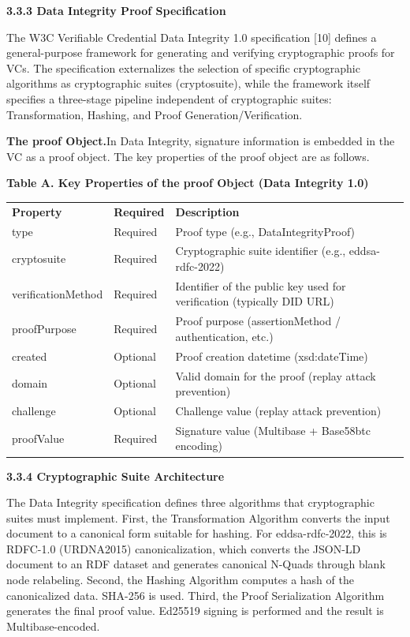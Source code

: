 \textbf{3.3.3 Data Integrity Proof Specification}

The W3C Verifiable Credential Data Integrity 1.0 specification {[}10{]} defines a general-purpose framework for generating and verifying cryptographic proofs for VCs. The specification externalizes the selection of specific cryptographic algorithms as cryptographic suites (cryptosuite), while the framework itself specifies a three-stage pipeline independent of cryptographic suites: Transformation, Hashing, and Proof Generation/Verification.

\textbf{The proof Object.}In Data Integrity, signature information is embedded in the VC as a proof object. The key properties of the proof object are as follows.

\textbf{Table A. Key Properties of the proof Object (Data Integrity 1.0)}

\begin{longtable}[]{@{}lll@{}}
\toprule
\endhead
\textbf{Property} & \textbf{Required} & \textbf{Description}\tabularnewline
type & Required & Proof type (e.g., DataIntegrityProof)\tabularnewline
cryptosuite & Required & Cryptographic suite identifier (e.g., eddsa-rdfc-2022)\tabularnewline
verificationMethod & Required & Identifier of the public key used for verification (typically DID URL)\tabularnewline
proofPurpose & Required & Proof purpose (assertionMethod / authentication, etc.)\tabularnewline
created & Optional & Proof creation datetime (xsd:dateTime)\tabularnewline
domain & Optional & Valid domain for the proof (replay attack prevention)\tabularnewline
challenge & Optional & Challenge value (replay attack prevention)\tabularnewline
proofValue & Required & Signature value (Multibase + Base58btc encoding)\tabularnewline
\bottomrule
\end{longtable}

\textbf{3.3.4 Cryptographic Suite Architecture}

The Data Integrity specification defines three algorithms that cryptographic suites must implement. First, the Transformation Algorithm converts the input document to a canonical form suitable for hashing. For eddsa-rdfc-2022, this is RDFC-1.0 (URDNA2015) canonicalization, which converts the JSON-LD document to an RDF dataset and generates canonical N-Quads through blank node relabeling. Second, the Hashing Algorithm computes a hash of the canonicalized data. SHA-256 is used. Third, the Proof Serialization Algorithm generates the final proof value. Ed25519 signing is performed and the result is Multibase-encoded.

